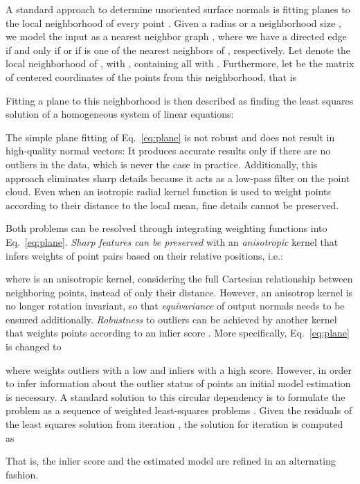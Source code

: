 \documentclass[10pt,twocolumn,letterpaper]{article}
\begin{document}
A standard approach to determine unoriented surface normals is fitting planes to the local neighborhood of every point  \cite{Levin:1998}. Given a radius  or a neighborhood size , we model the input as a nearest neighbor graph , where we have a directed edge  if and only if  or if  is one of the  nearest neighbors of , respectively. Let  denote the local neighborhood of , with , containing all  with . Furthermore, let  be the matrix of centered coordinates of the points from this neighborhood, that is 

Fitting a plane to this neighborhood is then described as finding the least squares solution of a homogeneous system of linear equations:

The simple plane fitting of Eq.~\ref{eq:plane} is not robust and does not result 
in high-quality normal vectors: It produces accurate results only if there are no outliers 
in the data, which is never the case in practice. Additionally, this approach eliminates sharp details because it 
acts as a low-pass filter on the point cloud. 
Even when an isotropic radial kernel function  is used
to weight points according to their distance to the local mean, fine details cannot be
preserved.


Both problems can be resolved through integrating weighting functions into Eq.~\ref{eq:plane}. \emph{Sharp features can be preserved} with an \emph{anisotropic} kernel that infers weights of
point pairs based on their relative positions, i.e.: 

where  is an anisotropic kernel, considering the full Cartesian relationship between neighboring points, instead of only their distance. However, an anisotrop kernel is no longer rotation invariant, so that \emph{equivariance} of output normals needs to be ensured additionally. 
\emph{Robustness} to outliers can be achieved by another kernel that weights points 
according to an inlier score . 
More specifically, Eq.~\ref{eq:plane} is changed to 

where  weights outliers with a low and inliers with a high score. However, in order to infer information about the outlier status of points an initial model estimation is necessary. A standard solution to this circular dependency is to formulate the problem as a sequence of weighted least-squares problems \cite{Holland:1977, Ranftl:2018}. Given the residuals  of the least squares solution from iteration , the solution for iteration  is computed as

That is, the inlier score and the estimated model are refined in an alternating fashion.
\end{document}

